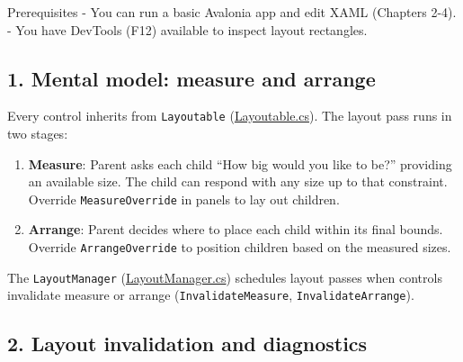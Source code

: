 Prerequisites - You can run a basic Avalonia app and edit XAML (Chapters
2-4). - You have DevTools (F12) available to inspect layout rectangles.

\subsection{1. Mental model: measure and
arrange}\label{mental-model-measure-and-arrange}

Every control inherits from \passthrough{\lstinline!Layoutable!}
(\href{https://github.com/AvaloniaUI/Avalonia/blob/master/src/Avalonia.Base/Layout/Layoutable.cs}{Layoutable.cs}).
The layout pass runs in two stages:

\begin{enumerate}
\def\labelenumi{\arabic{enumi}.}
\tightlist
\item
  \textbf{Measure}: Parent asks each child ``How big would you like to
  be?'' providing an available size. The child can respond with any size
  up to that constraint. Override
  \passthrough{\lstinline!MeasureOverride!} in panels to lay out
  children.
\item
  \textbf{Arrange}: Parent decides where to place each child within its
  final bounds. Override \passthrough{\lstinline!ArrangeOverride!} to
  position children based on the measured sizes.
\end{enumerate}

The \passthrough{\lstinline!LayoutManager!}
(\href{https://github.com/AvaloniaUI/Avalonia/blob/master/src/Avalonia.Base/Layout/LayoutManager.cs}{LayoutManager.cs})
schedules layout passes when controls invalidate measure or arrange
(\passthrough{\lstinline!InvalidateMeasure!},
\passthrough{\lstinline!InvalidateArrange!}).

\subsection{2. Layout invalidation and
diagnostics}\label{layout-invalidation-and-diagnostics}

